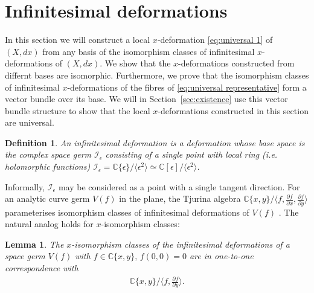\documentclass[11pt,twoside]{amsart}
\theoremstyle{plain}
\newtheorem{Lemma}[theorem]{Lemma}
\newtheorem{Definition}[theorem]{Definition}
\newcommand{\dfx}{dx}
\begin{document}
\section{Infinitesimal deformations}\label{sec:infinitesimal}
In this section we will construct a local $ x $-deformation  \eqref {eq:universal 1} of $ (X, \dfx) $ from any basis of the isomorphism classes of infinitesimal $ x $-deformations of $ (X, \dfx) $. %
We show that the $x$-deformations constructed from differnt bases are isomorphic.
Furthermore, we prove that the isomorphism classes of infinitesimal $ x $-deformations of the fibres of \eqref {eq:universal representative} form a vector bundle over its base. We will in Section~\ref{sec:existence} use this vector bundle structure to show that the local $ x $-deformations constructed in this section are universal. %
\begin{Definition}\label{def5}
An infinitesimal deformation is a deformation whose base space is the complex space germ $\mathcal{I}_\epsilon$ consisting of a single point with local ring (i.e. holomorphic functions) $\mathcal{I}_\epsilon=\mathbb{C}\{\epsilon\}/\langle\epsilon^2\rangle\simeq\mathbb{C}[\epsilon]/\langle\epsilon^2\rangle$. 
\end{Definition}
Informally, $\mathcal{I}_\epsilon $ may be considered as a point with a single tangent direction. For an analytic curve germ $ V (f) $ in the plane, %
the Tjurina algebra $\mathbb{C}\{x,y\}\big/\langle f,\tfrac{\partial f}{\partial x},\tfrac{\partial f}{\partial y}\rangle $ parameterises isomorphism classes of infinitesimal deformations of $ V (f) $ \cite[Theorem~10.1.5]{dJP:00}. The natural analog holds for $ x $-isomorphism classes: 
\begin{Lemma}\label{l1}
The  $x$-isomorphism classes of the infinitesimal deformations of a space germ $ V (f) $ with $f\in\mathbb{C}\{x,y\},\, f(0,0)=0$ are in one-to-one correspondence with 
\begin{align}\label{eq:quotient}
\mathbb{C}\{x,y\}\big/\langle f,\tfrac{\partial f}{\partial y}\rangle.
\end{align}
\end{Lemma}
\end{document}
